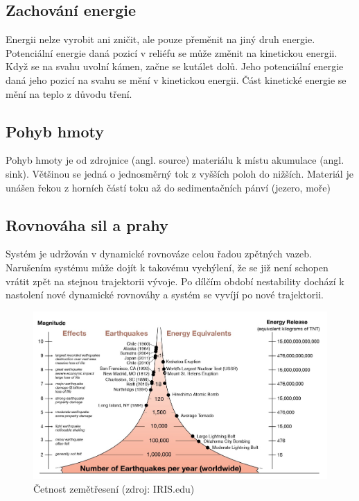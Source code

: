 \subsection{Zachování energie}
Energii nelze vyrobit ani zničit, ale pouze přeměnit na jiný druh energie. Potenciální energie daná pozicí v reliéfu se může změnit na kinetickou energii. Když se na svahu uvolní kámen, začne se kutálet dolů. Jeho potenciální energie daná jeho pozicí na svahu se mění v kinetickou energii. Část kinetické energie se mění na teplo z důvodu tření. 

\subsection{Pohyb hmoty}
Pohyb hmoty je od zdrojnice (angl. source) materiálu k místu akumulace (angl. sink). Většinou se jedná o jednosměrný tok z vyšších poloh do nižších. Materiál je unášen řekou z horních částí toku až do sedimentačních pánví (jezero, moře)

\subsection{Rovnováha sil a prahy}
Systém je udržován v dynamické rovnováze celou řadou zpětných vazeb. Narušením systému může dojít k takovému vychýlení, že se již není schopen vrátit zpět na stejnou trajektorii vývoje. Po dílčím období nestability dochází k nastolení nové dynamické rovnováhy a systém se vyvíjí po nové trajektorii.

\begin{figure}[h]
	\centering
	\includegraphics[width=1\linewidth]{obrazky/uvod/frekvence}
	\caption{Četnost zemětřesení (zdroj: IRIS.edu)}
	\label{fig:frekvence}
\end{figure}

